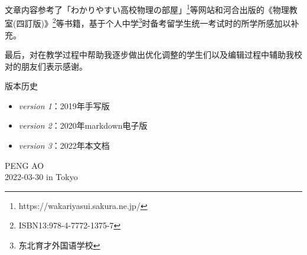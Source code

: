 文章内容参考了「わかりやすい高校物理の部屋」\footnote{https://wakariyasui.sakura.ne.jp/}等网站和河合出版的《物理教室(四訂版)》\footnote{ISBN13:978-4-7772-1375-7}等书籍，基于个人中学\footnote{东北育才外国语学校}时备考留学生统一考试时的所学所感加以补充。

最后，对在教学过程中帮助我逐步做出优化调整的学生们以及编辑过程中辅助我校对的朋友们表示感谢。

\vfill
版本历史
\begin{itemize}
    \item \textit{version 1}：2019年手写版
    \item \textit{version 2}：2020年markdown电子版
    \item \textit{version 3}：2022年本文档
\end{itemize}

\vfill
\begin{flushright}
    PENG AO\\
    2022-03-30 in Tokyo
\end{flushright}


\clearpage
\tableofcontents
